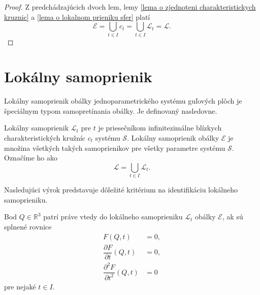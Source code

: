 \begin{proof}
Z predchádzajúcich dvoch lem, lemy \ref{lema o zjednoteni charakteristickych kruznic} a \ref{lema o lokalnom prieniku sfer} platí 
$$ \mathcal{E} = \bigcup_{t \in I } c_t = \bigcup_{t \in I} \mathcal{L}_t = \mathcal{L}. $$
\end{proof}

\section{Lokálny samoprienik}
Lokálny samoprienik obálky jednoparametrického systému guľových plôch je špeciálnym typom samopretínania obálky. Je definovaný nasledovne.
\begin{definition} \label{definicia lokalny samoprienik}
Lokálny samoprienik $\mathcal{L}_{t}$ pre $t$ je priesečníkom infinitezimálne blízkych charakteristických kružníc $c_{t}$ systému $\mathcal{S}$. Lokálny samoprienik obálky $\mathcal{E}$ je množina všetkých takých samoprienikov pre všetky parametre systému $\mathcal{S}$. Označíme ho ako $$\mathcal{L} = \bigcup_{t \in I} \mathcal{L}_t.$$
\end{definition}

Nasledujúci výrok predstavuje dôležité kritérium na identifikáciu lokálneho samoprieniku.
\begin{lemma} \label{kriterium o lokalnom samoprieniku}
Bod $Q \in \mathbb{R}^3$ patrí práve vtedy do lokálneho samoprieniku $\mathcal{L}_{t}$ obálky $\mathcal{E}$, ak sú splnené rovnice
\begin{align*}
F(Q,t) &= 0, \\
\dfrac{\partial F}{\partial t}(Q,t) &= 0, \\
\dfrac{\partial^2 F}{\partial t^2}(Q,t) &= 0
\end{align*}
pre nejaké $t \in I.$
\end{lemma}

